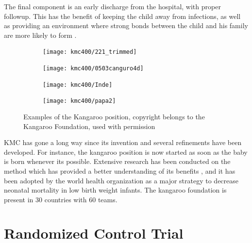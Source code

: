 The final component is an early discharge from the hospital, with proper followup. This has the benefit of keeping the child away from infections, as well as providing an environment where strong bonds between the child and his family are more likely to form \autocite{charpak_kangaroo_2005}. 

\begin{figure}
    \centering
    \begin{subfigure}{0.45\textwidth}
        \texttt{[image: kmc400/221\_trimmed]}
    \end{subfigure} \hfill
    \begin{subfigure}{0.45\textwidth}
        \texttt{[image: kmc400/0503canguro4d]}
    \end{subfigure}
		\par \bigskip
		\begin{subfigure}{0.45\textwidth}
        \texttt{[image: kmc400/Inde]}
    \end{subfigure} \hfill
		    \begin{subfigure}{0.45\textwidth}
        \texttt{[image: kmc400/papa2]}
    \end{subfigure}
    \caption{Examples of the Kangaroo position, copyright belongs to the Kangaroo Foundation, used with permission}\label{fig_kmc_position}
\end{figure}

KMC has gone a long way since its invention \autocite{charpak_kmc_2011} and several refinements have been developed. For instance, the kangaroo position is now started as soon as the baby is born whenever its possible. Extensive research has been conducted on the method which has provided a better understanding of its benefits \autocite{the_cochrane_collaboration_kangaroo_2014}, and it  has been adopted by the world health organization as a major strategy to decrease neonatal mortality in low birth weight infants. The kangaroo foundation is present in 30 countries with 60 teams. 


\section{Randomized Control Trial}

